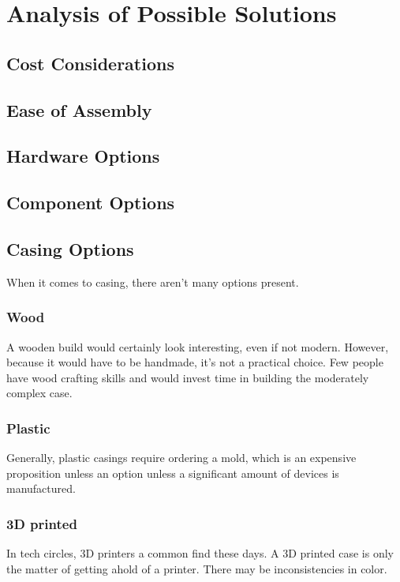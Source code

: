 \chapter{Analysis of Possible Solutions}
    \section{Cost Considerations}
        \blind[2]
    \section{Ease of Assembly}
        \blind[2]
    \section{Hardware Options}
        \blind[4]
    \section{Component Options}
    \section{Casing Options}
        When it comes to casing, there aren't many options present.
        \subsection{Wood}
            A wooden build would certainly look interesting, even if not modern.  However, because it would have to be handmade, it's not a practical choice.  Few people have wood crafting skills and would invest time in building the moderately complex case.
        \subsection{Plastic}
            Generally, plastic casings require ordering a mold, which is an expensive proposition unless an option unless a significant amount of devices is manufactured.
        \subsection{3D printed}
            In tech circles, 3D printers a common find these days.  A 3D printed case is only the matter of getting ahold of a printer.  There may be inconsistencies in color.  
            
